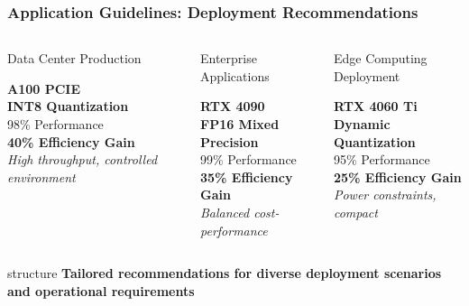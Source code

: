 \documentclass[aspectratio=169,xcolor=dvipsnames]{beamer}
\begin{document}
\begin{frame}
\frametitle{Application Guidelines: Deployment Recommendations}

\begin{columns}[c]
\begin{block}{Data Center Production}
\begin{center}
\textbf{A100 PCIE}\\
\textbf{INT8 Quantization}\\
\vspace{0.3cm}
98\% Performance\\
\textbf{40\% Efficiency Gain}\\
\vspace{0.2cm}
\textit{High throughput, controlled environment}
\end{center}
\end{block}

\begin{block}{Enterprise Applications}
\begin{center}
\textbf{RTX 4090}\\
\textbf{FP16 Mixed Precision}\\
\vspace{0.3cm}
99\% Performance\\
\textbf{35\% Efficiency Gain}\\
\vspace{0.2cm}
\textit{Balanced cost-performance}
\end{center}
\end{block}

\begin{block}{Edge Computing Deployment}
\begin{center}
\textbf{RTX 4060 Ti}\\
\textbf{Dynamic Quantization}\\
\vspace{0.3cm}
95\% Performance\\
\textbf{25\% Efficiency Gain}\\
\vspace{0.2cm}
\textit{Power constraints, compact}
\end{center}
\end{block}

\end{columns}

\vspace{0.5cm}
\begin{center}
\begin{beamercolorbox}[wd=0.9\textwidth,center]{structure}
\textbf{Tailored recommendations for diverse deployment scenarios and operational requirements}
\end{beamercolorbox}
\end{center}
\end{frame}
\end{document}
